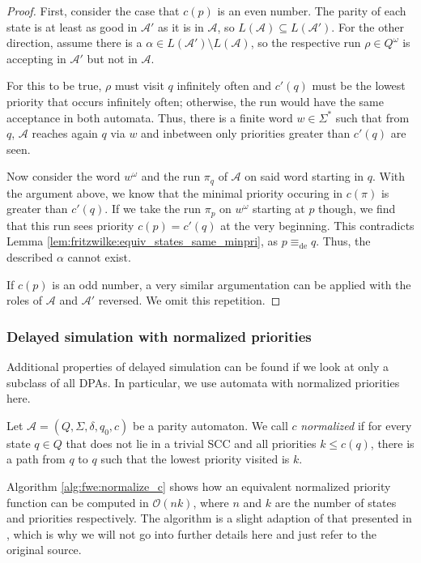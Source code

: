 \begin{proof}
	First, consider the case that $c(p)$ is an even number. The parity of each state is at least as good in $\mathcal{A}'$ as it is in $\mathcal{A}$, so $L(\mathcal{A}) \subseteq L(\mathcal{A}')$. For the other direction, assume there is a $\alpha \in L(\mathcal{A}') \setminus L(\mathcal{A})$, so the respective run $\rho \in Q^\omega$ is accepting in $\mathcal{A}'$ but not in $\mathcal{A}$. 
	
	For this to be true, $\rho$ must visit $q$ infinitely often and $c'(q)$ must be the lowest priority that occurs infinitely often; otherwise, the run would have the same acceptance in both automata. Thus, there is a finite word $w \in \Sigma^*$ such that from $q$, $\mathcal{A}$ reaches again $q$ via $w$ and inbetween only priorities greater than $c'(q)$ are seen.
	
	Now consider the word $w^\omega$ and the run $\pi_q$ of $\mathcal{A}$ on said word starting in $q$. With the argument above, we know that the minimal priority occuring in $c(\pi)$ is greater than $c'(q)$. If we take the run $\pi_p$ on $w^\omega$ starting at $p$ though, we find that this run sees priority $c(p) = c'(q)$ at the very beginning. This contradicts Lemma \ref{lem:fritzwilke:equiv_states_same_minpri}, as $p \equiv_\text{de} q$. Thus, the described $\alpha$ cannot exist. 
	
	If $c(p)$ is an odd number, a very similar argumentation can be applied with the roles of $\mathcal{A}$ and $\mathcal{A}'$ reversed. We omit this repetition.
\end{proof}




\subsubsection{Delayed simulation with normalized priorities}
Additional properties of delayed simulation can be found if we look at only a subclass of all DPAs. In particular, we use automata with normalized priorities here. 

\begin{defn}
	Let $\mathcal{A} = (Q, \Sigma, \delta, q_0, c)$ be a parity automaton. We call $c$ \emph{normalized} if for every state $q \in Q$ that does not lie in a trivial SCC and all priorities $k \leq c(q)$, there is a path from $q$ to $q$ such that the lowest priority visited is $k$.
\end{defn}

Algorithm \ref{alg:fwe:normalize_c} shows how an equivalent normalized priority function can be computed in $\mathcal{O}(nk)$, where $n$ and $k$ are the number of states and priorities respectively. The algorithm is a slight adaption of that presented in \cite{}, which is why we will not go into further details here and just refer to the original source.

